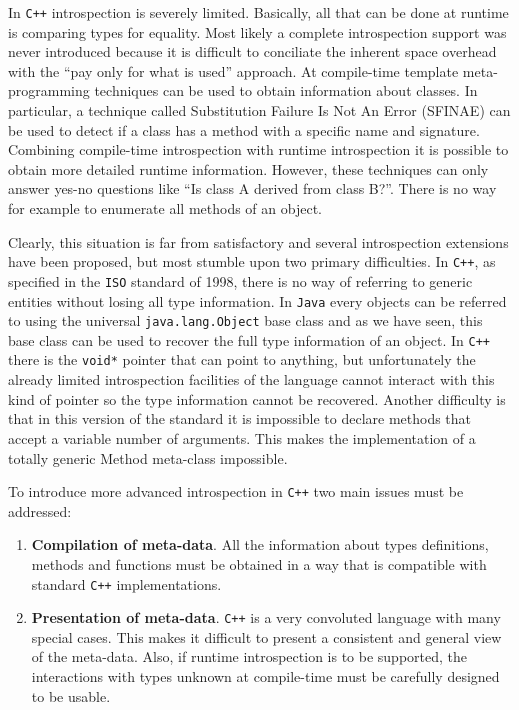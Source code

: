 In \texttt{C++} introspection is severely limited. Basically, all that can be done at runtime is comparing types for equality. Most likely a complete
introspection support was never introduced because it is difficult to conciliate the inherent space overhead with the ``pay only for what
is used'' approach. At compile-time template meta-programming techniques can be used to obtain information about classes.
In particular, a technique called Substitution Failure Is Not An Error (SFINAE) can be used to detect if a class has a method with
a specific name and signature. Combining compile-time introspection with runtime introspection it is possible to obtain more
detailed runtime information. However, these techniques can only answer yes-no questions like ``Is class A derived from class B?''.
There is no way for example to enumerate all methods of an object.

Clearly, this situation is far from satisfactory and several introspection extensions have been proposed, but most stumble upon
two primary difficulties. In \texttt{C++}, as specified in the \texttt{ISO} standard of 1998, there is no way of referring to generic entities 
without losing all type information. In \texttt{Java} every objects can be referred to using the universal \texttt{java.lang.Object} base class
and as we have seen, this base class can be used to recover the full type information of an object. In \texttt{C++} there is the \texttt{void*}
pointer that can point to anything, but unfortunately the already limited introspection facilities of the language cannot interact
with this kind of pointer so the type information cannot be recovered. Another difficulty is that in this version of the standard
it is impossible to declare methods that accept a variable number of arguments. This makes the implementation of a totally generic
Method meta-class impossible.

To introduce more advanced introspection in \texttt{C++} two main issues must be addressed:

\begin{enumerate}
 \item \textbf{Compilation of meta-data}. All the information about types definitions, methods and functions must be obtained in a way that
is compatible with standard \texttt{C++} implementations.
 \item \textbf{Presentation of meta-data}. \texttt{C++} is a very convoluted language with many special cases. This makes it difficult to
 present a consistent and general view of the meta-data. Also, if runtime introspection is to be supported, the interactions
 with types unknown at compile-time must be carefully designed to be usable.
\end{enumerate}

